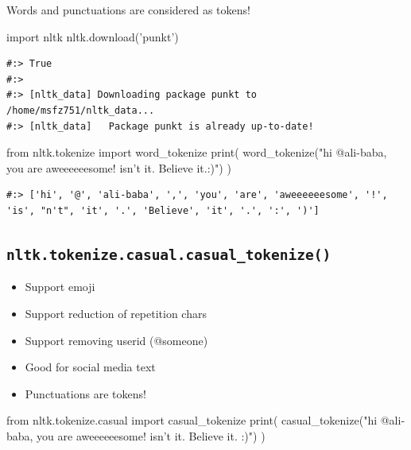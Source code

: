\documentclass[
]{book}
\newenvironment{Shaded}{\begin{snugshade}}{\end{snugshade}}
\newcommand{\BuiltInTok}[1]{#1}
\newcommand{\ImportTok}[1]{#1}
\newcommand{\NormalTok}[1]{#1}
\newcommand{\StringTok}[1]{\textcolor[rgb]{0.5,0.5,0.5}{#1}}
\providecommand{\tightlist}{%
  \setlength{\itemsep}{0pt}\setlength{\parskip}{0pt}}
\begin{document}
Words and punctuations are considered as tokens!

\begin{Shaded}
\begin{Highlighting}[]
\ImportTok{import}\NormalTok{ nltk}
\NormalTok{nltk.download(}\StringTok{'punkt'}\NormalTok{)}
\end{Highlighting}
\end{Shaded}

\begin{verbatim}
#:> True
#:> 
#:> [nltk_data] Downloading package punkt to /home/msfz751/nltk_data...
#:> [nltk_data]   Package punkt is already up-to-date!
\end{verbatim}

\begin{Shaded}
\begin{Highlighting}[]
\ImportTok{from}\NormalTok{ nltk.tokenize }\ImportTok{import}\NormalTok{ word_tokenize}
\BuiltInTok{print}\NormalTok{( word_tokenize(}\StringTok{"hi @ali-baba, you are aweeeeeesome! isn't it. Believe it.:)"}\NormalTok{) )}
\end{Highlighting}
\end{Shaded}

\begin{verbatim}
#:> ['hi', '@', 'ali-baba', ',', 'you', 'are', 'aweeeeeesome', '!', 'is', "n't", 'it', '.', 'Believe', 'it', '.', ':', ')']
\end{verbatim}

\hypertarget{nltk.tokenize.casual.casual_tokenize}{%
\subsection{\texorpdfstring{\texttt{nltk.tokenize.casual.casual\_tokenize()}}{nltk.tokenize.casual.casual\_tokenize()}}\label{nltk.tokenize.casual.casual_tokenize}}

\begin{itemize}
\tightlist
\item
  Support emoji
\item
  Support reduction of repetition chars
\item
  Support removing userid (@someone)
\item
  Good for social media text
\item
  Punctuations are tokens!
\end{itemize}

\begin{Shaded}
\begin{Highlighting}[]
\ImportTok{from}\NormalTok{ nltk.tokenize.casual     }\ImportTok{import}\NormalTok{ casual_tokenize}
\BuiltInTok{print}\NormalTok{( casual_tokenize(}\StringTok{"hi @ali-baba, you are aweeeeeesome! isn't it. Believe it. :)"}\NormalTok{) )  }
\end{Highlighting}
\end{Shaded}
\end{document}
